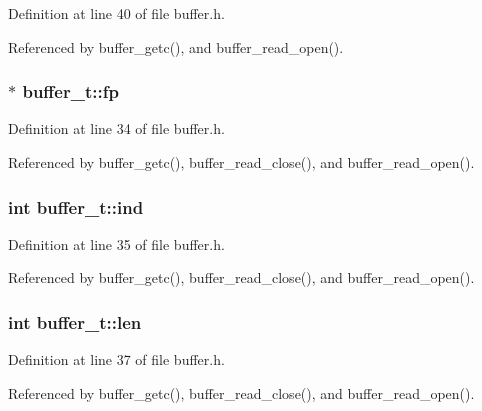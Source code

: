 Definition at line 40 of file buffer.\+h.



Referenced by buffer\+\_\+getc(), and buffer\+\_\+read\+\_\+open().

\subsubsection[{\texorpdfstring{fp}{fp}}]{$\ast$ buffer\+\_\+t\+::fp}\hypertarget{structbuffer__t_a00a55014e0827223c41b1b1d56e5be5d}{}\label{structbuffer__t_a00a55014e0827223c41b1b1d56e5be5d}


Definition at line 34 of file buffer.\+h.



Referenced by buffer\+\_\+getc(), buffer\+\_\+read\+\_\+close(), and buffer\+\_\+read\+\_\+open().

\subsubsection[{\texorpdfstring{ind}{ind}}]{\setlength{\rightskip}{0pt plus 5cm}int buffer\+\_\+t\+::ind}\hypertarget{structbuffer__t_a59ea992e5006ead050862bae5c41670a}{}\label{structbuffer__t_a59ea992e5006ead050862bae5c41670a}


Definition at line 35 of file buffer.\+h.



Referenced by buffer\+\_\+getc(), buffer\+\_\+read\+\_\+close(), and buffer\+\_\+read\+\_\+open().

\subsubsection[{\texorpdfstring{len}{len}}]{\setlength{\rightskip}{0pt plus 5cm}int buffer\+\_\+t\+::len}\hypertarget{structbuffer__t_a0b67fc6880d331ae05dab0e58a4584c2}{}\label{structbuffer__t_a0b67fc6880d331ae05dab0e58a4584c2}


Definition at line 37 of file buffer.\+h.



Referenced by buffer\+\_\+getc(), buffer\+\_\+read\+\_\+close(), and buffer\+\_\+read\+\_\+open().


